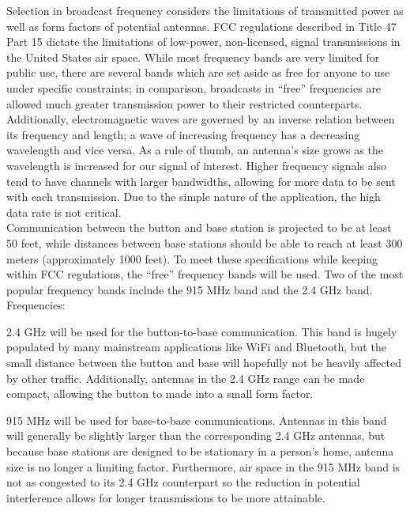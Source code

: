 \documentclass[journal]{IEEEtran}
\begin{document}
\noindent Selection in broadcast frequency considers the limitations of transmitted power as well as form factors of potential antennas.  FCC regulations described in Title 47 Part 15 dictate the limitations of low-power, non-licensed, signal transmissions in the United States air space.  While most frequency bands are very limited for public use, there are several bands which are set aside as free for anyone to use under specific constraints; in comparison, broadcasts in “free” frequencies are allowed much greater transmission power to their restricted counterparts.  Additionally, electromagnetic waves are governed by an inverse relation between its frequency and length; a wave of increasing frequency has a decreasing wavelength and vice versa.  As a rule of thumb, an antenna’s size grows as the wavelength is increased for our signal of interest. Higher frequency signals also tend to have channels with larger bandwidths, allowing for more data to be sent with each transmission.  Due to the simple nature of the application, the high data rate is not critical.\\

\noindent Communication between the button and base station is projected to be at least 50 feet, while distances between base stations should be able to reach at least 300 meters (approximately 1000 feet).  To meet these specifications while keeping within FCC regulations, the “free” frequency bands will be used. Two of the most popular frequency bands include the 915 MHz band and the 2.4 GHz band.\\

\noindent Frequencies:
\begin{LaTeXdescription}
  \item [2.4 GHz] will be used for the button-to-base communication. This band is hugely populated by many mainstream applications like WiFi and Bluetooth, but the small distance between the button and base will hopefully not be heavily affected by other traffic. Additionally, antennas in the 2.4 GHz range can be made compact, allowing the button to made into a small form factor.\\
  \item[915 MHz] will be used for base-to-base communications.  Antennas in this band will generally be slightly larger than the corresponding 2.4 GHz antennas, but because base stations are designed to be stationary in a person’s home, antenna size is no longer a limiting factor.  Furthermore, air space in the 915 MHz band is not as congested to its 2.4 GHz counterpart so the reduction in potential interference allows for longer transmissions to be more attainable.
\end{LaTeXdescription}
\end{document}
